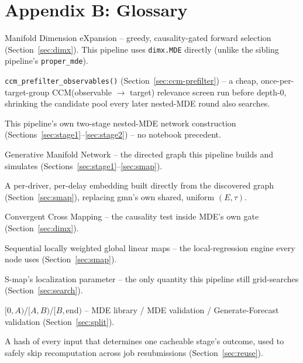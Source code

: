 \documentclass[11pt]{article}
\begin{document}
\section*{Appendix B: Glossary}
\begin{description}[leftmargin=3.2cm, style=nextline]
  \item[MDE] Manifold Dimension eXpansion -- greedy, causality-gated forward selection (Section~\ref{sec:dimx}). This pipeline uses \texttt{dimx.MDE} directly (unlike the sibling pipeline's \texttt{proper\_mde}).
  \item[CCM pre-filter] \texttt{ccm\_prefilter\_observables()} (Section~\ref{sec:ccm-prefilter}) -- a cheap, once-per-target-group CCM(observable $\to$ target) relevance screen run before depth-0, shrinking the candidate pool every later nested-MDE round also searches.
  \item[Stage 1 / Stage 2] This pipeline's own two-stage nested-MDE network construction (Sections~\ref{sec:stage1}--\ref{sec:stage2}) -- no notebook precedent.
  \item[GMN] Generative Manifold Network -- the directed graph this pipeline builds and simulates (Sections~\ref{sec:stage1}--\ref{sec:smap}).
  \item[Generalized embedding] A per-driver, per-delay embedding built directly from the discovered graph (Section~\ref{sec:smap}), replacing gmn's own shared, uniform $(E,\tau)$.
  \item[CCM] Convergent Cross Mapping -- the causality test inside MDE's own gate (Section~\ref{sec:dimx}).
  \item[S-map] Sequential locally weighted global linear maps -- the local-regression engine every node uses (Section~\ref{sec:smap}).
  \item[$\theta$] S-map's localization parameter -- the only quantity this pipeline still grid-searches (Section~\ref{sec:search}).
  \item[Three-way split] $[0,A)$/$[A,B)$/$[B,\mathrm{end})$ -- MDE library / MDE validation / Generate-Forecast validation (Section~\ref{sec:split}).
  \item[Fingerprint] A hash of every input that determines one cacheable stage's outcome, used to safely skip recomputation across job resubmissions (Section~\ref{sec:reuse}).
\end{description}
\end{document}
